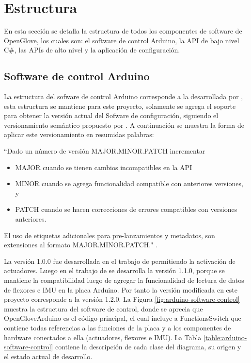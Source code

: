 \section{Estructura}
\label{seccion-estructura}
En esta sección se detalla la estructura de todos los componentes de software de OpenGlove, los cuales son: el software de control Arduino, la API de bajo nivel C\#, las APIs de alto nivel  y la aplicación de configuración.





\subsection{Software de control Arduino}
\label{subseccion-estructura-arduino-software}
La estructura del sofware de control Arduino corresponde a la desarrollada por \cite{tesis-cerda-rodrigo}, esta estructura se mantiene para este proyecto, solamente se agrega el soporte para obtener la versión actual del Sofware de configuración, siguiendo el versionamiento semántico propuesto por \cite{semantic-versioning-tom-preston-werner-coFounder-GitHub}. A continuación se muestra la forma de aplicar este versionamiento en resumidas palabras:

``Dado un número de versión MAJOR.MINOR.PATCH incrementar
\begin{itemize}
\item MAJOR cuando se tienen cambios incompatibles en la API
\item MINOR cuando se agrega funcionalidad compatible con anteriores versiones, y
\item PATCH cuando se hacen correcciones de errores compatibles con versiones anteriores.
\end{itemize}
El uso de etiquetas adicionales para pre-lanzamientos y metadatos, son extensiones al formato MAJOR.MINOR.PATCH." \citep{semantic-versioning-tom-preston-werner-coFounder-GitHub}. 

La versión 1.0.0 fue desarrollada en el trabajo de \cite{tesis-monsalve-rodrigo} permitiendo la activación de actuadores. Luego en el trabajo de \cite{tesis-cerda-rodrigo} se desarrolla la versión 1.1.0, porque se mantiene la compatibilidad luego de agregar la funcionalidad de lectura de datos de flexores e IMU en la placa Arduino. Por tanto la versión modificada en este proyecto corresponde a la versión 1.2.0. La Figura \ref{fig:arduino-software-control} muestra la estructura del software de control, donde se aprecia que OpenGloveArduino es el código principal, el cual incluye a FunctionsSwitch que contiene todas referencias a las funciones de la placa y a los componentes de hardware conectados a ella (actuadores, flexores e IMU).  La Tabla \ref{table:arduino-software-control} contiene la descripción de cada clase del diagrama, su origen y el estado actual de desarrollo.

